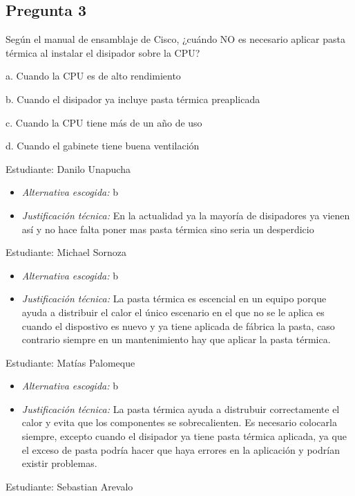 \documentclass{article}
\begin{document}
\subsection{Pregunta 3}
\label{sec:orgf8a445a}
Según el manual de ensamblaje de Cisco, ¿cuándo NO es necesario aplicar pasta térmica al instalar el disipador sobre la CPU?

a. Cuando la CPU es de alto rendimiento

b. Cuando el disipador ya incluye pasta térmica preaplicada

c. Cuando la CPU tiene más de un año de uso

d. Cuando el gabinete tiene buena ventilación

Estudiante: Danilo Unapucha

\begin{itemize}
\item \emph{Alternativa escogida:} b
\item \emph{Justificación técnica:} En la actualidad ya la mayoría de
disipadores ya vienen así y no hace falta poner mas pasta térmica sino seria un desperdicio
\end{itemize}

Estudiante: Michael Sornoza

\begin{itemize}
\item \emph{Alternativa escogida:} b
\item \emph{Justificación técnica:} La pasta térmica es escencial en un equipo porque ayuda a distribuir el calor
el único escenario en el que no se le aplica es cuando el dispostivo es nuevo y ya tiene aplicada
de fábrica la pasta, caso contrario siempre en un mantenimiento hay que aplicar la pasta térmica.
\end{itemize}

Estudiante: Matías Palomeque

\begin{itemize}
\item \emph{Alternativa escogida:} b
\item \emph{Justificación técnica:} La pasta térmica ayuda a distrubuir
correctamente el calor y evita que los componentes se
sobrecalienten. Es necesario colocarla siempre, excepto cuando el
disipador ya tiene pasta térmica aplicada, ya que el exceso de pasta
podría hacer que haya errores en la aplicación y podrían existir problemas.
\end{itemize}

Estudiante: Sebastian Arevalo
\end{document}
